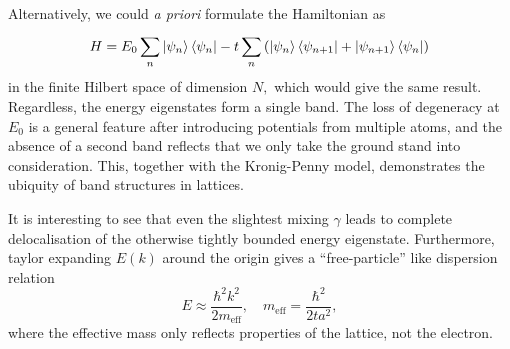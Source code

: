 \documentclass{article}
\theoremstyle{nonumberplain}
\begin{document}
Alternatively, we could \textit{a priori} formulate the Hamiltonian as
\[
    H = E_0 \sum_{n}^{} \ket{\psi_n}\bra{\psi_n} - t \sum_{n}^{} \left( \ket{\psi_n} \bra{\psi_{n+1}} + \ket{\psi_{n+1}} \bra{\psi_n}\right)
\]
in the finite Hilbert space of dimension $N,$ which would give the same result. Regardless, the energy eigenstates form a single band. The loss of degeneracy at $E_0$ is a general feature after introducing potentials from multiple atoms, and the absence of a second band reflects that we only take the ground stand into consideration. This, together with the Kronig-Penny model, demonstrates the ubiquity of band structures in lattices. 

It is interesting to see that even the slightest mixing $\gamma $ leads to complete delocalisation of the otherwise tightly bounded energy eigenstate. Furthermore, taylor expanding $E(k)$ around the origin gives a ``free-particle'' like dispersion relation
\[
    E \approx \frac{\hbar ^{2} k^{2} }{2m_{\mathrm{eff} }}, \quad 
    m_{\mathrm{eff} } = \frac{\hbar ^{2} }{2 t a^{2}},
\]
where the effective mass only reflects properties of the lattice, not the electron. 
\end{document}
